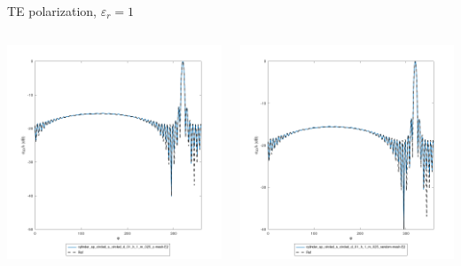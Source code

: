 \begin{frame}{TE polarization, $\varepsilon_r=1$}
\begin{columns}

\includegraphics[width=\linewidth]{results/FF/cylD_01_H_1_M_025_Z/epr1_TE_norm.png}


\includegraphics[width=\linewidth]{results/FF/cylD_01_H_1_M_025_RANDOM/epr1_TE_norm.png}

\end{columns}



\end{frame}

